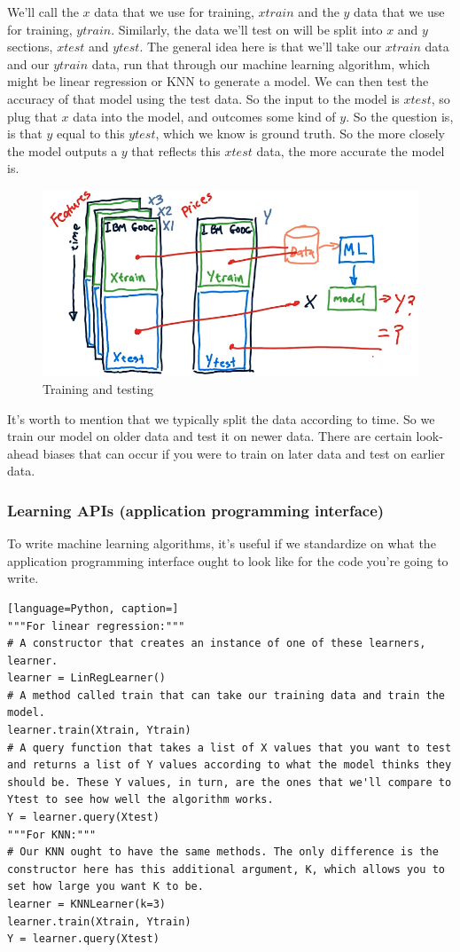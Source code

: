 \documentclass[12pt]{article}
\begin{document}
We'll call the $x$ data that we use for training, $xtrain$ and the $y$ data that we use for training, $ytrain$. Similarly, the data we'll test on will be split into $x$ and $y$ sections, $xtest$ and $ytest$. The general idea here is that we'll take our $xtrain$ data and our $ytrain$ data, run that through our machine learning algorithm, which might be linear regression or KNN to generate a model. We can then test the accuracy of that model using the test data. So the input to the model is $xtest$, so plug that $x$ data into the model, and outcomes some kind of $y$. So the question is, is that $y$ equal to this $ytest$, which we know is ground truth. So the more closely the model outputs a $y$ that reflects this $xtest$ data, the more accurate the model is. 

\begin{figure}[!ht]
\centering
\includegraphics[scale=0.4]{fig/fig85}
\caption{Training and testing}
\end{figure}

It's worth to mention that we typically split the data according to time. So we train our model on older data and test it on newer data. There are certain look-ahead biases that can occur if you were to train on later data and test on earlier data.  

\subsubsection{Learning APIs (application programming interface)}

To write machine learning algorithms, it's useful if we standardize on what the application programming interface ought to look like for the code you're going to write. 
\begin{lstlisting}[language=Python, caption=]
"""For linear regression:"""
# A constructor that creates an instance of one of these learners, learner.
learner = LinRegLearner() 
# A method called train that can take our training data and train the model.
learner.train(Xtrain, Ytrain)
# A query function that takes a list of X values that you want to test and returns a list of Y values according to what the model thinks they should be. These Y values, in turn, are the ones that we'll compare to Ytest to see how well the algorithm works. 
Y = learner.query(Xtest)
"""For KNN:"""
# Our KNN ought to have the same methods. The only difference is the constructor here has this additional argument, K, which allows you to set how large you want K to be. 
learner = KNNLearner(k=3)
learner.train(Xtrain, Ytrain)
Y = learner.query(Xtest)
\end{lstlisting}
\end{document}
